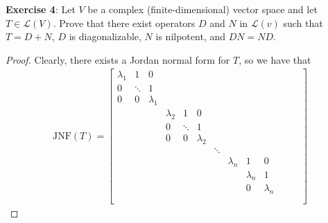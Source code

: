 \documentclass{article}
\begin{document}
\textbf{Exercise 4}: Let $V$ be a complex (finite-dimensional) vector space and let $T \in \mathcal{L}(V)$. Prove that there exist operators $D$ and $N$ in $\mathcal{L}(v)$ such that $T = D + N$, $D$ is diagonalizable, $N$ is nilpotent, and $DN = ND$.
    \begin{proof}
        Clearly, there exists a Jordan normal form for $T$, so we have that 
            \begin{align*}
                \text{JNF}(T) =
                \begin{bmatrix}
                    \lambda_{1} & 1      & 0           &             &        &             &        &             &             &             &  &  &  \\
                    0           & \ddots & 1           &             &        &             &        &             &             &             &  &  &  \\
                    0           & 0      & \lambda_{1} &             &        &             &        &             &             &             &  &  &  \\
                                &        &             & \lambda_{2} & 1      & 0           &        &             &             &             &  &  &  \\
                                &        &             & 0           & \ddots & 1           &        &             &             &             &  &  &  \\
                                &        &             & 0           & 0      & \lambda_{2} &        &             &             &             &  &  &  \\
                                &        &             &             &        &             & \ddots &             &             &             &  &  &  \\
                                &        &             &             &        &             &        & \lambda_{n} & 1           & 0           &  &  &  \\
                                &        &             &             &        &             &        &             & \lambda_{n} & 1           &  &  &  \\
                                &        &             &             &        &             &        &             & 0           & \lambda_{n} &  &  &  \\
                                &        &             &             &        &             &        &             &             &             &  &  &  \\

\end{bmatrix}
\end{align*}
\end{proof}
\end{document}
